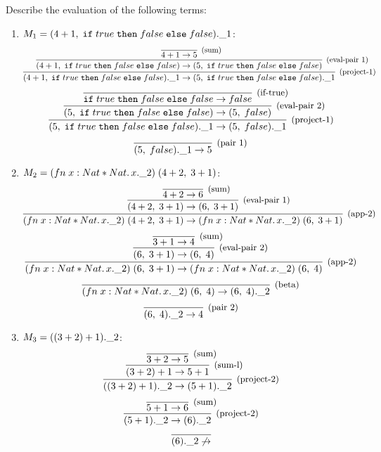 \subsection{}

Describe the evaluation of the following terms:
\begin{enumerate}
	\item $M_1 = (4+1,\;\texttt{if}\;true\;\texttt{then}\;false\;\texttt{else}\;false).\_1$:
	      \[
		      \infer[\text{\small{(project-1)}}]
		      { \FST{\PAIR{\SUM{4}{1}}{\IF{true}{false}{false}}} \to \FST{\PAIR{5}{\IF{true}{false}{false}}}}
		      {
			      \infer[\text{\small{(eval-pair 1)}}]
			      { \PAIR{\SUM{4}{1}}{\IF{true}{false}{false}} \to \PAIR{5}{\IF{true}{false}{false}} }
			      { \infer[\text{\small{(sum)}}]{\SUM{4}{1} \to 5}{} }
		      }
	      \]
	      \[
		      \infer[\text{\small{(project-1)}}]
		      { \FST{\PAIR{5}{\IF{true}{false}{false}}} \to \FST{\PAIR{5}{false}}}
		      {
			      \infer[\text{\small{(eval-pair 2)}}]
			      { \PAIR{5}{\IF{true}{false}{false}} \to \PAIR{5}{false}}
			      { \infer[\text{\small(if-true)}]{\IF{true}{false}{false} \to false}{} }
		      }
	      \]
	      \[
		      \infer[\text{\small{(pair 1)}}]
		      { \FST{\PAIR{5}{false}} \to 5}{}
	      \]
	\item $M_2 = (fn\;x: Nat \ast Nat.\,x.\_2)\;(4+2,\;3+1)$:
	      \[
		      \infer[\text{\small{(app-2)}}]
		      {\APP{(\FN{x: Nat \ast Nat}{\SND{x}})}{\PAIR{\SUM{4}{2}}{\SUM{3}{1}}} \to \APP{(\FN{x: Nat \ast Nat}{\SND{x}})}{\PAIR{6}{\SUM{3}{1}}}}
		      {
			      \infer[\text{\small{(eval-pair 1)}}]
			      {\PAIR{\SUM{4}{2}}{\SUM{3}{1}} \to \PAIR{6}{\SUM{3}{1}}}
			      {
				      \infer[\text{\small{(sum)}}]{\SUM{4}{2} \to 6}{}
			      }
		      }
	      \]
	      \[
		      \infer[\text{\small{(app-2)}}]
		      {\APP{(\FN{x: Nat \ast Nat}{\SND{x}})}{\PAIR{6}{\SUM{3}{1}}} \to \APP{(\FN{x: Nat \ast Nat}{\SND{x}})}{\PAIR{6}{4}}}
		      {
			      \infer[\text{\small{(eval-pair 2)}}]
			      {\PAIR{6}{\SUM{3}{1}} \to \PAIR{6}{4}}
			      { \infer[\text{\small{(sum)}}]{\SUM{3}{1} \to 4}{} }
		      }
	      \]
	      \[
		      \infer[\text{\small{(beta)}}]
		      {\APP{(\FN{x: Nat \ast Nat}{\SND{x}})}{\PAIR{6}{4}} \to \SND{\PAIR{6}{4}}}
		      {}
	      \]
	      \[
		      \infer[\text{\small{(pair 2)}}]{\SND{\PAIR{6}{4}} \to 4}{}
	      \]
	\item $M_3 = ((3+2)+1).\_2$:
	      \[
		      \infer[\text{\small{(project-2)}}]
		      {\SND{(\SUM{(\SUM{3}{2})}{1})} \to \SND{(\SUM{5}{1})}}
		      {
			      \infer[\text{\small{(sum-l)}}]
			      {\SUM{(\SUM{3}{2})}{1} \to \SUM{5}{1}}
			      {
				      \infer[\text{\small{(sum)}}]{\SUM{3}{2} \to 5}{}
			      }
		      }
	      \]
	      \[
		      \infer[\text{\small{(project-2)}}]
		      {\SND{(\SUM{5}{1})} \to \SND{(6)}}
		      { \infer[\text{\small{(sum)}}]{\SUM{5}{1} \to 6}{} }
	      \]
	      \[
		      \infer{\SND{(6)} \not\to }{}
	      \]
\end{enumerate}
